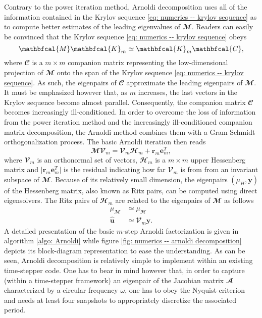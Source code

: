     Contrary to the power iteration method, Arnoldi decomposition uses all of the information contained in the Krylov sequence \eqref{eq: numerics -- krylov sequence} as to compute better estimates of the leading eigenvalues of $\mathbfcal{M}$. Readers can easily be convinced that the Krylov sequence \eqref{eq: numerics -- krylov sequence} obeys
    \begin{equation}
      \mathbfcal{M} \mathbfcal{K}_m \simeq \mathbfcal{K}_m \mathbfcal{C},
      \notag
    \end{equation}
    where $\mathbfcal{C}$ is a $m \times m$ companion matrix representing the low-dimensional projection of $\mathbfcal{M}$ onto the span of the Krylov sequence \eqref{eq: numerics -- krylov sequence}. As such, the eigenpairs of $\mathbfcal{C}$ approximate the leading eigenpairs of $\mathbfcal{M}$. It must be emphasized however that, as $m$ increases, the last vectors in the Krylov sequence become almost parallel. Consequently, the companion matrix $\mathbfcal{C}$ becomes increasingly ill-conditioned. In order to overcome the loss of information from the power iteration method and the increasingly ill-conditioned companion matrix decomposition, the Arnoldi method combines them with a Gram-Schmidt orthogonalization process. The basic Arnoldi iteration then reads
    \begin{equation}
      \mathbfcal{MV}_m = \mathbfcal{V}_m \mathbfcal{H}_m + \mathbf{r}_{m} \mathbf{e}^T_m,
      \label{eq: numerics -- m-step Arnoldi}
    \end{equation}
    where $\mathbfcal{V}_m$ is an orthonormal set of vectors, $\mathbfcal{H}_m$ is a $m \times m$ upper Hessenberg matrix and $\vert \mathbf{r}_{m} \mathbf{e}^T_m \vert$ is the residual indicating how far $\mathbfcal{V}_m$ is from from an invariant subspace of $\mathbfcal{M}$. Because of its relatively small dimension, the eigenpairs $\left( \mu_H, \mathbf{y} \right)$ of the Hessenberg matrix, also known as Ritz pairs, can be computed using direct eigensolvers. The Ritz pairs of $\mathbfcal{H}_m$ are related to the eigenpairs of $\mathbfcal{M}$ as follows
    \begin{equation}
      \begin{aligned}
        \mu_{\mathbfcal{M}} & \simeq \mu_{\mathbfcal{H}} \\
        \hat{\mathbf{u}} & \simeq \mathbfcal{V}_m \mathbf{y}.
      \end{aligned}
    \end{equation}
    A detailed presentation of the basic $m$-step Arnoldi factorization is given in algorithm \eqref{algo: Arnoldi} while figure \ref{fig: numerics -- arnoldi decomposition} depicts its block-diagram representation to ease the understanding. As can be seen, Arnoldi decomposition is relatively simple to implement within an existing time-stepper code. One has to bear in mind however that, in order to capture (within a time-stepper framework) an eigenpair of the Jacobian matrix $\mathbfcal{A}$ characterized by a circular frequency $\omega$, one has to obey the Nyquist criterion and needs at least four snapshots to appropriately discretize the associated period.

